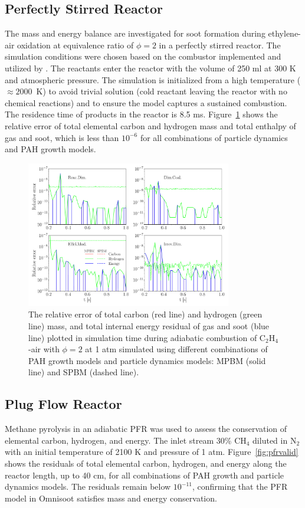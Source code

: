 \subsection{Perfectly Stirred Reactor}
\label{sec:psrvalid}
The mass and energy balance are investigated for soot formation during ethylene-air oxidation at equivalence ratio of $\phi=2$ in a perfectly stirred reactor. The simulation conditions were chosen based on the combustor implemented and utilized by \citet{stouffer2002combustion}. The reactants enter the reactor with the volume of 250 ml at 300 K and atmospheric pressure. The simulation is initialized from a high temperature ($\approx2000$~K) to avoid trivial solution (cold reactant leaving the reactor with no chemical reactions) and to ensure the model captures a sustained combustion. The residence time of products in the reactor is 8.5 ms. Figure~\ref{fig:psrvalid} shows the relative error of total elemental carbon and hydrogen mass and total enthalpy of gas and soot, which is less than $10^{-6}$ for all combinations of particle dynamics and PAH growth models.

\begin{figure}[H]
	\centering
	\includegraphics[width=0.8\textwidth]{Figures/Results/Validation/PSR/relerr_psr.pdf}
	\caption{The relative error of total carbon (red line) and hydrogen (green line) mass, and total internal energy residual of gas and soot (blue line) plotted in simulation time during adiabatic combustion of $\mathrm{C_2H_4}$-air with $\phi=2$ at 1 atm simulated using different combinations of PAH growth models and particle dynamics models: MPBM (solid line) and SPBM (dashed line).}
	\label{fig:psrvalid}
\end{figure}

\subsection{Plug Flow Reactor}
Methane pyrolysis in an adiabatic PFR was used to assess the conservation of elemental carbon, hydrogen, and energy. The inlet stream 30\% $\mathrm{CH_4}$ diluted in $\mathrm{N_2}$ with an initial temperature of 2100 K and pressure of 1 atm. Figure~\ref{fig:pfrvalid} shows the residuals of total elemental carbon, hydrogen, and energy along the reactor length, up to 40 cm, for all combinations of PAH growth and particle dynamics models. The residuals remain below $10^{-11}$, confirming that the PFR model in Omnisoot satisfies mass and energy conservation.


